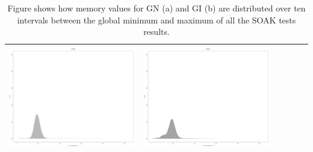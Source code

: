 \begin{table}[htbp]
{\begin{tabular}{l | ccccc}
\begin{minipage}{.15\textwidth}
     			 	\includegraphics[width=\linewidth]{images/mema-dens-graph/I14}
    				 \end{minipage}
    			   &	 \begin{minipage}{.15\textwidth}\vspace{2pt}     							
     			 	\includegraphics[width=\linewidth]{images/mema-dens-graph/I15}
    				 \end{minipage}\\
		\hline %
	 \end{tabular}
	}
	\caption[\textsc{Analyser} Investigation Stack - Level 2 - Pattern Identification - Memory Distribution - Baselines GN and GI]{Figure shows how memory values for GN (a) and GI (b) are distributed over ten intervals between the global  minimum and maximum of all the SOAK tests results.} 
	\label{tab:level2-memory-density-graph}
	\end{table}